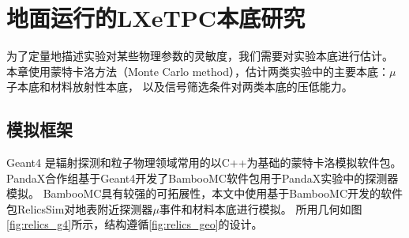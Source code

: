 
\chapter{地面运行的LXeTPC本底研究}
\label{sec:backgrounds}

为了定量地描述实验对某些物理参数的灵敏度，我们需要对实验本底进行估计。
本章使用蒙特卡洛方法（Monte Carlo method），估计两类实验中的主要本底：$\mu$子本底和材料放射性本底，
以及信号筛选条件对两类本底的压低能力。

\section{模拟框架}

Geant4 是辐射探测和粒子物理领域常用的以C++为基础的蒙特卡洛模拟软件包\cite{agostinelli_geant4simulation_2003,allison_geant4_2006,allison_recent_2016}。
PandaX合作组基于Geant4开发了BambooMC软件包用于PandaX实验中的探测器模拟\cite{chen_bamboomc_2021}。
BambooMC具有较强的可拓展性，本文中使用基于BambooMC开发的软件包RelicsSim对地表附近探测器$\mu$事件和材料本底进行模拟。
所用几何如图\ref{fig:relics_g4}所示，结构遵循\ref{fig:relics_geo}的设计。

